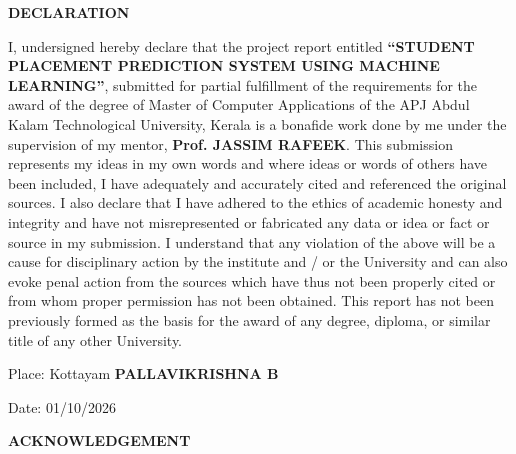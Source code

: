 \documentclass[12pt,a4paper]{report}
\begin{document}
\newpage


\newpage
\thispagestyle{empty}

\begin{center}
    {\large\textbf{DECLARATION}}
\end{center}

\vspace{0.45cm}

\noindent
I, undersigned hereby declare that the project report entitled
\textbf{``STUDENT PLACEMENT PREDICTION SYSTEM USING MACHINE
LEARNING''}, submitted for partial fulfillment of the requirements
for the award of the degree of Master of Computer Applications of
the APJ Abdul Kalam Technological University, Kerala is a bonafide
work done by me under the supervision of my mentor,
\textbf{Prof. JASSIM RAFEEK}. This submission represents my ideas
in my own words and where ideas or words of others have been
included, I have adequately and accurately cited and referenced
the original sources. I also declare that I have adhered to the
ethics of academic honesty and integrity and have not
misrepresented or fabricated any data or idea or fact or source in
my submission. I understand that any violation of the above will
be a cause for disciplinary action by the institute and / or the
University and can also evoke penal action from the sources which
have thus not been properly cited or from whom proper permission
has not been obtained. This report has not been previously formed
as the basis for the award of any degree, diploma, or similar
title of any other University.

\vspace{3.8cm}

\noindent
Place: Kottayam
\hfill
\textbf{PALLAVIKRISHNA B}

\vspace{0.35cm}

\noindent
Date: 01/10/2026

\newpage


\newpage
\thispagestyle{empty}

\begin{center}
    {\large\textbf{ACKNOWLEDGEMENT}}
\end{center}
\end{document}
